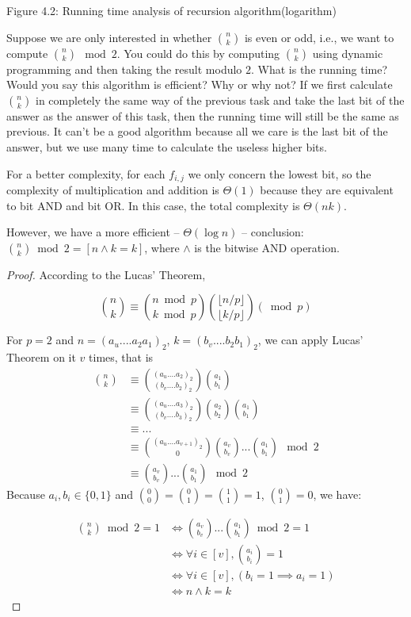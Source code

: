 \documentclass[11pt,a4paper,oneside]{article}
\begin{document}
\begin{problem}{4}
\begin{center}
	Figure 4.2: Running time analysis of recursion algorithm(logarithm)
	\end{center}
\end{problem}

\begin{problem}{5}
    \statement
    Suppose we are only interested in whether ${n \choose k}$ is even or odd,
  i.e., we want to compute ${n \choose k}  \mod 2$. You could do this by computing 
  ${n \choose k}$ using dynamic programming and then taking
  the result modulo $2$. What is the running time? Would you say this algorithm
  is efficient? Why or why not?
  \solution
If we first calculate ${n \choose k}$ in completely the same way of the previous task and take the last bit of the answer as the answer of this task, then the running time will still be the same as previous. It can't be a good algorithm because all we care is the last bit of the answer, but we use many time to calculate the useless higher bits.

For a better complexity, for each $f_{i, j}$ we only concern the lowest bit, so the complexity of multiplication and addition is $\Theta(1)$ because they are equivalent to bit AND and bit OR. In this case, the total complexity is $\Theta(nk)$.

However, we have a more efficient  -- $\Theta (\log n)$ -- conclusion:  $ {n \choose k} \bmod 2 = [n \wedge k = k]$, where $\wedge$ is the bitwise AND operation.
	\begin{proof}
		According to the Lucas' Theorem, 
		
		\[
			{n \choose k}\equiv{{n \bmod p} \choose {k \bmod p}}{{ \lfloor n/p\rfloor} \choose { \lfloor k/p\rfloor}}(\bmod p)
		\]
		
		For $p=2$ and $n=(a_u....a_2a_1)_2$, $k=(b_v....b_2b_1)_2$, we can apply Lucas' Theorem on it $v$ times, that is
		\begin{align*}
			{n \choose k} &\equiv {(a_u....a_2)_2 \choose (b_v....b_2)_2}{a_1 \choose b_1}\\
			&\equiv {(a_u....a_3)_2 \choose (b_v....b_3)_2}{a_2 \choose b_2}{a_1 \choose b_1} \\
			&\equiv ...\\	
			&\equiv {(a_u....a_{v+1})_2 \choose 0}{a_v \choose b_v}...{a_1 \choose b_1}\mod 2\\
			&\equiv {a_v \choose b_v}...{a_1 \choose b_1}\mod 2
		\end{align*}		
		Because $a_i,b_i\in \{0,1\}$ and ${0 \choose 0}={0 \choose 1}={1 \choose 1}=1$, ${0 \choose 1}=0$, we have:
		
		\[
			\begin{split}
			{n \choose k} \bmod 2 = 1 &\Leftrightarrow {a_v \choose b_v}...{a_1 \choose b_1}\bmod 2=1 \\
			&\Leftrightarrow \forall i \in [v], {a_i \choose b_i}=1\\
			&\Leftrightarrow \forall i \in [v], (b_i=1\implies a_i=1)\\
			&\Leftrightarrow n \wedge k = k
			\end{split}
		\]		
    \end{proof}
\end{problem}
\end{document}
